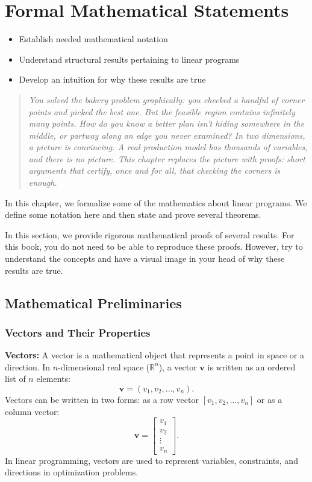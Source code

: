 \chapter{Formal Mathematical Statements}
\begin{outcome}
\begin{itemize}
\item Establish needed mathematical notation
\item Understand structural results pertaining to linear programs
\item Develop an intuition for why these results are true
\end{itemize}
\end{outcome}

\begin{quote}
\itshape You solved the bakery problem graphically: you checked a handful of corner points and picked the best one. But the feasible region contains infinitely many points. How do you \emph{know} a better plan isn't hiding somewhere in the middle, or partway along an edge you never examined? In two dimensions, a picture is convincing. A real production model has thousands of variables, and there is no picture. This chapter replaces the picture with proofs: short arguments that certify, once and for all, that checking the corners is enough.
\end{quote}

In this chapter, we formalize some of the mathematics about linear programs.  We define some notation here and then state and prove several theorems.   

\begin{warn}
In this section, we provide rigorous mathematical proofs of several results.  For this book, you do not need to be able to reproduce these proofs.  However, try to understand the concepts and have a visual image in your head of why these results are true.
\end{warn}

\section{Mathematical Preliminaries}\label{sec:math-preliminaries}

\subsection{Vectors and Their Properties}

\textbf{Vectors:}  
A vector is a mathematical object that represents a point in space or a direction. In \(n\)-dimensional real space (\(\mathbb{R}^n\)), a vector \(\mathbf{v}\) is written as an ordered list of \(n\) elements:  
\[
\mathbf{v} = (v_1, v_2, \dots, v_n).
\]  
Vectors can be written in two forms: as a row vector \([v_1, v_2, \dots, v_n]\) or as a column vector:
\[
\mathbf{v} = \begin{bmatrix} v_1 \\ v_2 \\ \vdots \\ v_n \end{bmatrix}.
\]  
In linear programming, vectors are used to represent variables, constraints, and directions in optimization problems.

